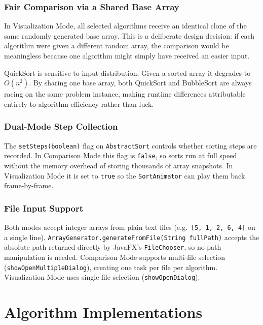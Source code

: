 \documentclass[12pt,a4paper]{article}
\begin{document}
\subsubsection{Fair Comparison via a Shared Base Array}

In Visualization Mode, all selected algorithms receive an identical clone of the
same randomly generated base array. This is a deliberate design decision: if
each algorithm were given a different random array, the comparison would be
meaningless because one algorithm might simply have received an easier input.

\begin{designbox}[title=Why This Matters]
    QuickSort is sensitive to input distribution. Given a sorted array it
    degrades to $O(n^2)$. By sharing one base array, both QuickSort and
    BubbleSort are always racing on the same problem instance, making runtime
    differences attributable entirely to algorithm efficiency rather than luck.
\end{designbox}

\subsubsection{Dual-Mode Step Collection}

The \texttt{setSteps(boolean)} flag on \texttt{AbstractSort} controls whether
sorting steps are recorded. In Comparison Mode this flag is \texttt{false}, so
sorts run at full speed without the memory overhead of storing thousands of array
snapshots. In Visualization Mode it is set to \texttt{true} so the
\texttt{SortAnimator} can play them back frame-by-frame.

\subsubsection{File Input Support}

Both modes accept integer arrays from plain text files (e.g.\ \texttt{[5, 1, 2, 6, 4]}
on a single line). \texttt{ArrayGenerator.generateFromFile(String fullPath)}
accepts the absolute path returned directly by JavaFX's \texttt{FileChooser}, so
no path manipulation is needed. Comparison Mode supports multi-file selection
(\texttt{showOpenMultipleDialog}), creating one task per file per algorithm.
Visualization Mode uses single-file selection (\texttt{showOpenDialog}).

\section{Algorithm Implementations}
\end{document}
